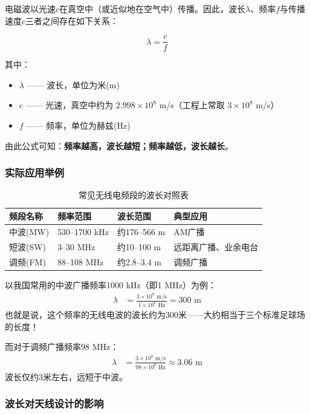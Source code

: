 \documentclass[12pt,UTF8]{ctexbook}
\begin{document}
电磁波以光速$c$在真空中（或近似地在空气中）传播。因此，波长$\lambda$、频率$f$与传播速度$c$三者之间存在如下关系：

\begin{equation}
	\lambda = \frac{c}{f}
\end{equation}

其中：
\begin{itemize}
	\item $\lambda$ —— 波长，单位为米(m)
	\item $c$ —— 光速，真空中约为 $2.998 \times 10^{8}$ m/s（工程上常取 $3 \times 10^{8}$ m/s）
	\item $f$ —— 频率，单位为赫兹(Hz)
\end{itemize}

由此公式可知：\textbf{频率越高，波长越短；频率越低，波长越长}。\subsubsection{实际应用举例}\begin{table}[htbp]
	\centering
	\caption{常见无线电频段的波长对照表}
	\label{tab:wavelength_examples}
	\begin{tabular}{llll}
		\hline
		\textbf{频段名称} & \textbf{频率范围} & \textbf{波长范围} & \textbf{典型应用} \\
		\hline
		中波(MW)   & 530--1700 kHz  & 约176--566 m & AM广播 \\
		短波(SW)   & 3--30 MHz      & 约10--100 m  & 远距离广播、业余电台 \\
		调频(FM)   & 88--108 MHz    & 约2.8--3.4 m & 调频广播 \\
		\hline
	\end{tabular}
\end{table}

以我国常用的中波广播频率1000 kHz（即1 MHz）为例：
\begin{align*}
	\lambda &= \frac{3 \times 10^{8} \text{ m/s}}{1 \times 10^{6} \text{ Hz}} = 300 \text{ m}
\end{align*}
也就是说，这个频率的无线电波的波长约为300米——大约相当于三个标准足球场的长度！

而对于调频广播频率98 MHz：
\begin{align*}
	\lambda &= \frac{3 \times 10^{8} \text{ m/s}}{98 \times 10^{6} \text{ Hz}} \approx 3.06 \text{ m}
\end{align*}
波长仅约3米左右，远短于中波。\subsubsection{波长对天线设计的影响}
\end{document}
